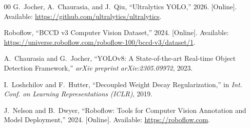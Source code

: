 \documentclass[conference]{IEEEtran}
\begin{document}

\begin{thebibliography}{00}
G.~Jocher, A.~Chaurasia, and J.~Qiu, ``Ultralytics YOLO,'' 2026. [Online]. Available: \url{https://github.com/ultralytics/ultralytics}.

Roboflow, ``BCCD v3 Computer Vision Dataset,'' 2024. [Online]. Available: \url{https://universe.roboflow.com/roboflow-100/bccd-v3/dataset/1}.

A.~Chaurasia and G.~Jocher, ``YOLOv8: A State-of-the-art Real-time Object Detection Framework,'' \textit{arXiv preprint arXiv:2305.09972}, 2023.

I.~Loshchilov and F.~Hutter, ``Decoupled Weight Decay Regularization,'' in \textit{Int. Conf. on Learning Representations (ICLR)}, 2019.

J.~Nelson and B.~Dwyer, ``Roboflow: Tools for Computer Vision Annotation and Model Deployment,'' 2024. [Online]. Available: \url{https://roboflow.com}.
\end{thebibliography}
\end{document}
